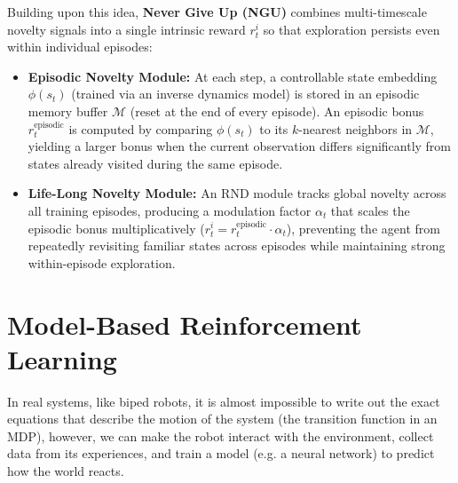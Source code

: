 \documentclass[10pt, a4paper]{report}
\begin{document}
Building upon this idea, \textbf{Never Give Up (NGU)} combines multi-timescale novelty signals into a single intrinsic reward $r_t^i$ so that exploration persists even within individual episodes:
\begin{itemize}
    \item \textbf{Episodic Novelty Module:} At each step, a controllable state embedding $\phi(s_t)$ (trained via an inverse dynamics model) is stored in an episodic memory buffer $\mathcal{M}$ (reset at the end of every episode). An episodic bonus $r_t^{\text{episodic}}$ is computed by comparing $\phi(s_t)$ to its $k$-nearest neighbors in $\mathcal{M}$, yielding a larger bonus when the current observation differs significantly from states already visited during the same episode.
    \item \textbf{Life-Long Novelty Module:} An RND module tracks global novelty across all training episodes, producing a modulation factor $\alpha_t$ that scales the episodic bonus multiplicatively ($r_t^i = r_t^{\text{episodic}} \cdot \alpha_t$), preventing the agent from repeatedly revisiting familiar states across episodes while maintaining strong within-episode exploration.
\end{itemize}
\chapter{Model-Based Reinforcement Learning}
In real systems, like biped robots, it is almost impossible to write out the exact equations that describe the motion of the system (the transition function in an MDP), however, we can make the robot interact with the environment, collect data from its experiences, and train a model (e.g. a neural network) to predict how the world reacts.\bigskip 
\end{document}
